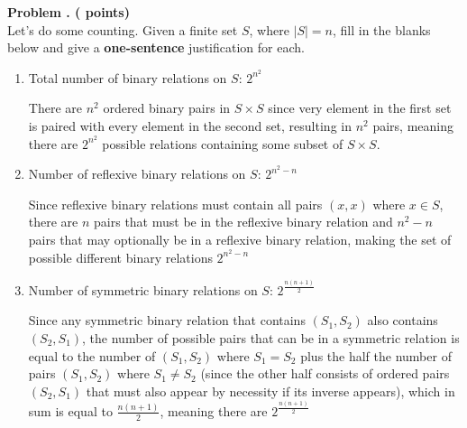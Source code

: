 \newpage
\addtocounter{problemctr}{1}

{\bf
Problem \theproblemctr.  (\therelation\xspace points)}
\\

Let's do some counting. Given a finite set $S$, where $\lvert S \rvert= n$, fill in the blanks below and give a {\bf one-sentence} justification for each.

\vspace{.2in}

\begin{enumerate}[label=(\arabic*),itemsep=1.5in]
\item
Total number of binary relations on $S$:
\underline{$2^{n^2}$}

\bigskip

There are $n^2$ ordered binary pairs in $S\times S$ since very element in the first set is paired with every element in the second set, resulting in $n^2$ pairs, meaning there are $2^{n^2}$ possible relations containing some subset of $S\times S$. 
\item
Number of reflexive binary relations on $S$:
\underline{$2^{n^2-n}$}

\bigskip

Since reflexive binary relations must contain all pairs $(x,x)$ where $x\in S$, there are $n$ pairs that must be in the reflexive binary relation and $n^2-n$ pairs that may optionally be in a reflexive binary relation, making the set of possible different binary relations $2^{n^2-n}$
\item
Number of symmetric binary relations on $S$:
\underline{$2^{\frac{n(n+1)}{2}}$}

\bigskip

Since any symmetric binary relation that contains $(S_1,S_2)$ also contains $(S_2,S_1)$, the number of possible pairs that can be in a symmetric relation is equal to the number of $(S_1,S_2)$ where $S_1=S_2$ plus the half the number of pairs $(S_1,S_2)$ where $S_1\neq S_2$ (since the other half consists of ordered pairs $(S_2,S_1)$ that must also appear by necessity if its inverse appears), which in sum is equal to $\frac{n(n+1)}{2}$, meaning there are $2^{\frac{n(n+1)}{2}}$
\end{enumerate}

\newpage
